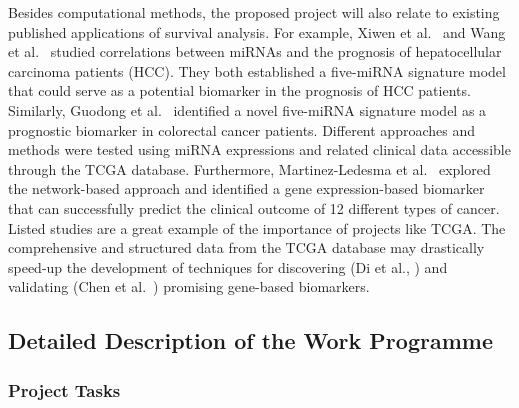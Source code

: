 \documentclass[11pt,a4paper]{article}
\begin{document}
Besides computational methods, the proposed project will also relate to existing published applications of survival analysis. For example, Xiwen et al.~\cite{liao2018identification} and Wang et al.~\cite{33313167} studied correlations between miRNAs and the prognosis of hepatocellular carcinoma patients (HCC). They both established a five-miRNA signature model that could serve as a potential biomarker in the prognosis of HCC patients. Similarly, Guodong et al.~\cite{31799184} identified a novel five-miRNA signature model as a prognostic biomarker in colorectal cancer patients. Different approaches and methods were tested using miRNA expressions and related clinical data accessible through the TCGA database. Furthermore, Martinez-Ledesma et al.~\cite{26202601} explored the network-based approach and identified a gene expression-based biomarker that can successfully predict the clinical outcome of 12 different types of cancer. Listed studies are a great example of the importance of projects like TCGA. The comprehensive and structured data from the TCGA database may drastically speed-up the development of techniques for discovering (Di et al., \cite{29676997}) and validating (Chen et al.~\cite{32289666}) promising gene-based biomarkers.



\subsection{Detailed Description of the Work Programme}

\subsubsection{Project Tasks}
\end{document}

